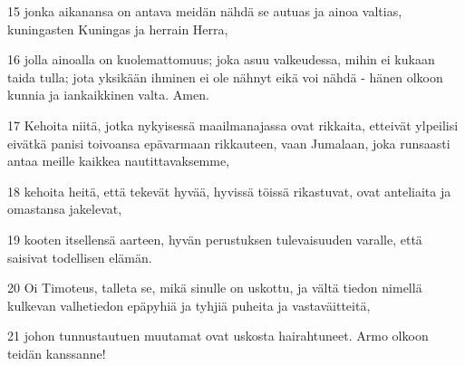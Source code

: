 \par 15 jonka aikanansa on antava meidän nähdä se autuas ja ainoa valtias, kuningasten Kuningas ja herrain Herra,
\par 16 jolla ainoalla on kuolemattomuus; joka asuu valkeudessa, mihin ei kukaan taida tulla; jota yksikään ihminen ei ole nähnyt eikä voi nähdä - hänen olkoon kunnia ja iankaikkinen valta. Amen.
\par 17 Kehoita niitä, jotka nykyisessä maailmanajassa ovat rikkaita, etteivät ylpeilisi eivätkä panisi toivoansa epävarmaan rikkauteen, vaan Jumalaan, joka runsaasti antaa meille kaikkea nautittavaksemme,
\par 18 kehoita heitä, että tekevät hyvää, hyvissä töissä rikastuvat, ovat anteliaita ja omastansa jakelevat,
\par 19 kooten itsellensä aarteen, hyvän perustuksen tulevaisuuden varalle, että saisivat todellisen elämän.
\par 20 Oi Timoteus, talleta se, mikä sinulle on uskottu, ja vältä tiedon nimellä kulkevan valhetiedon epäpyhiä ja tyhjiä puheita ja vastaväitteitä,
\par 21 johon tunnustautuen muutamat ovat uskosta hairahtuneet. Armo olkoon teidän kanssanne!


